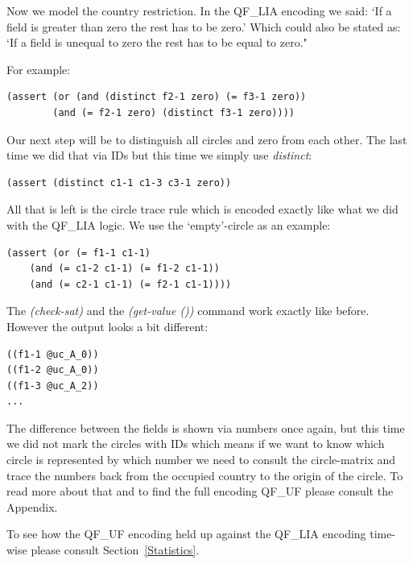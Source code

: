 Now we model the country restriction. In the QF\_LIA encoding we said: `If a field is greater than zero the rest has to be zero.' Which could also be stated as: `If a field is unequal to zero the rest has to be equal to zero."

For example:
\begin{lstlisting}
(assert (or (and (distinct f2-1 zero) (= f3-1 zero)) 
	    (and (= f2-1 zero) (distinct f3-1 zero))))
\end{lstlisting}

Our next step will be to distinguish all circles and zero from each other. The last time we did that via IDs but this time we simply use \emph{distinct}:
\begin{lstlisting}
(assert (distinct c1-1 c1-3 c3-1 zero))
\end{lstlisting}

All that is left is the circle trace rule which is encoded exactly like what we did with the QF\_LIA logic. We use the `empty'-circle as an example:
\begin{lstlisting}
(assert (or (= f1-1 c1-1) 
	(and (= c1-2 c1-1) (= f1-2 c1-1)) 
	(and (= c2-1 c1-1) (= f2-1 c1-1))))
\end{lstlisting}

The \emph{(check-sat)} and the \emph{(get-value ())} command work exactly like before. However the output looks a bit different:
\begin{lstlisting}
((f1-1 @uc_A_0))
((f1-2 @uc_A_0))
((f1-3 @uc_A_2))
...
\end{lstlisting}
The difference between the fields is shown via numbers once again, but this time we did not mark the circles with IDs which means if we want to know which circle is represented by which number we need to consult the circle-matrix and trace the numbers back from the occupied country to the origin of the circle. To read more about that and to find the full encoding QF\_UF please consult the Appendix.

To see how the QF\_UF encoding held up against the QF\_LIA encoding time-wise please consult Section~\ref{Statistics}.

